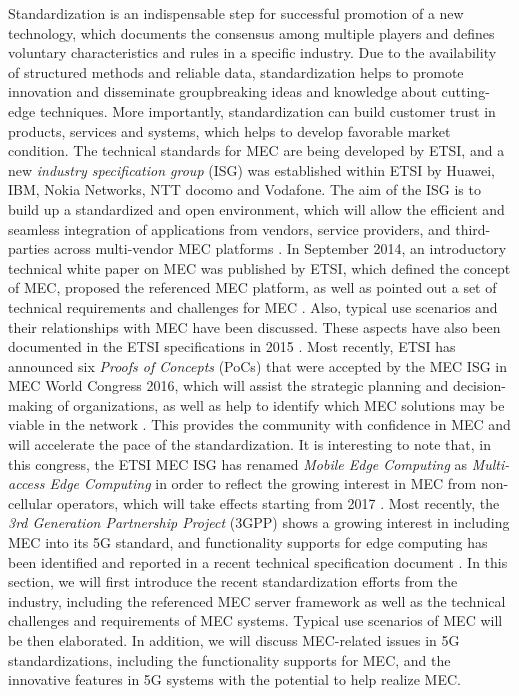 \documentclass[journal]{IEEEtran}
\begin{document}
{Standardization is an indispensable step for successful promotion of a new technology, which documents the consensus among multiple players and defines voluntary characteristics and rules in a specific industry. Due to the availability of structured methods and reliable data, standardization helps to promote innovation and disseminate groupbreaking ideas and knowledge about cutting-edge techniques. More importantly, standardization can build customer trust in products, services and systems, which helps to develop favorable market condition. The technical standards for MEC are being developed by ETSI, and a new \emph{industry specification group} (ISG) was established within ETSI by Huawei, IBM, Nokia Networks, NTT docomo and Vodafone. The aim of the ISG is to build up a standardized and open environment, which will allow the efficient and seamless integration of applications from vendors, service providers, and third-parties across multi-vendor MEC platforms \cite{ETSI_Briefing}. In September 2014, an introductory technical white paper on MEC was published by ETSI, which defined the concept of MEC, proposed the referenced MEC platform, as well as pointed out a set of technical requirements and challenges for MEC \cite{ETSI14}. Also, typical use scenarios and their relationships with MEC have been discussed. These aspects have also been documented in the ETSI specifications in 2015 \cite{ETSI_Term,ETSI_ServiceScenarios,ETSI_Framework,ETSI_TechRequir}. Most recently, ETSI has announced six \emph{Proofs of Concepts} (PoCs) that were accepted by the MEC ISG in MEC World Congress 2016, which will assist the strategic planning and decision-making of organizations, as well as help to identify which MEC solutions may be viable in the network \cite{PoC1stETSI}. This provides the community with confidence in MEC and will accelerate the pace of the standardization. It is interesting to note that, in this congress, the ETSI MEC ISG has renamed \emph{Mobile Edge Computing} as \emph{Multi-access Edge Computing} in order to reflect the growing interest in MEC from non-cellular operators, which will take effects starting from 2017 \cite{MECmultipleaccess}. {\color{black}Most recently, the \emph{3rd Generation Partnership Project} (3GPP) shows a growing interest in including MEC into its 5G standard, and functionality supports for edge computing has been identified and reported in a recent technical specification document \cite{3GPPTS23501}.} In this section, we will first introduce the recent standardization efforts from the industry, including the referenced MEC server framework as well as the technical challenges and requirements of MEC systems. Typical use scenarios of MEC will be then elaborated. {\color{black}In addition, we will discuss MEC-related issues in 5G standardizations, including the functionality supports for MEC, and the innovative features in 5G systems with the potential to help realize MEC.}

}
\end{document}
